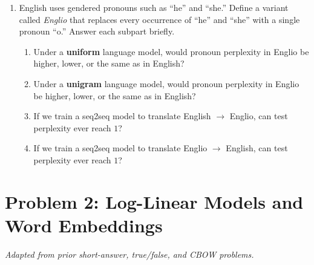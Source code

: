 \begin{enumerate}[label=(\alph*)]
\item English uses gendered pronouns such as ``he'' and ``she.'' Define a variant called \emph{Englio} that replaces every occurrence of ``he'' and ``she'' with a single pronoun ``o.'' Answer each subpart briefly.
\begin{enumerate}[label=(\roman*)]
\item Under a \textbf{uniform} language model, would pronoun perplexity in Englio be higher, lower, or the same as in English?
\item Under a \textbf{unigram} language model, would pronoun perplexity in Englio be higher, lower, or the same as in English?
\item If we train a seq2seq model to translate English \(\to\) Englio, can test perplexity ever reach \(1\)?
\item If we train a seq2seq model to translate Englio \(\to\) English, can test perplexity ever reach \(1\)?
\end{enumerate}
\end{enumerate}



\section*{Problem 2: Log-Linear Models and Word Embeddings}
\textit{Adapted from prior short-answer, true/false, and CBOW problems.}

